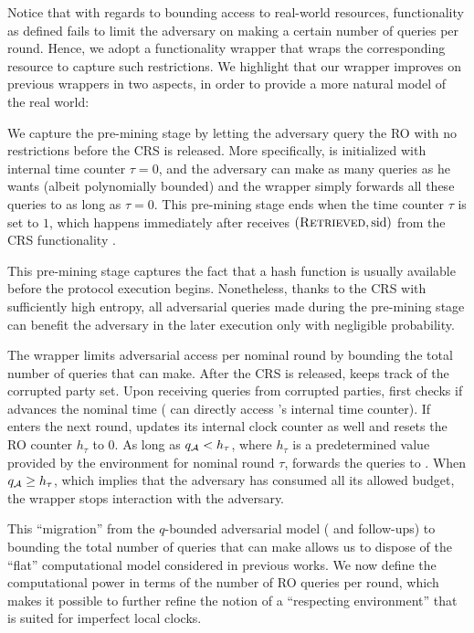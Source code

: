 Notice that with regards to bounding access to real-world resources, functionality \funcRO as defined fails to limit the adversary on making a certain number of queries per round.
%
Hence, we adopt a functionality wrapper \cite{C:BMTZ17,EC:GKOPZ20} \wrapper{\funcRO} that wraps the corresponding resource to capture such restrictions.
We highlight that our wrapper \wrapper{\funcRO} improves on previous wrappers in two aspects, in order to provide a more natural model of the real world:
%
\begin{cccItemize}[noitemsep]
      \item We capture the pre-mining stage by letting the adversary query the RO with no restrictions before the CRS is released.
      More specifically, \wrapper{\funcRO} is initialized with internal time counter $\tau = 0$, and the adversary can make as many queries as he wants (albeit polynomially bounded) and the wrapper simply forwards all these queries to \funcRO as long as $\tau = 0$.
      This pre-mining stage ends when the time counter $\tau$ is set to $1$, which happens immediately after \wrapper{\funcRO} receives $(\textsc{Retrieved}, \mathrm{sid})$ from the CRS functionality \funcCRS.

      This pre-mining stage captures the fact that a hash function is usually available before the protocol execution begins.
      Nonetheless, thanks to the CRS with sufficiently high entropy, all adversarial queries made during the pre-mining stage can benefit the adversary in the later execution only with negligible probability.

      \item The wrapper limits adversarial access per nominal round by bounding the total number of queries that \adv can make.
      After the CRS is released, \wrapper{\funcRO} keeps track of the corrupted party set.
      Upon receiving queries from corrupted parties, \wrapper{\funcRO} first checks if \funcImpClock advances the nominal time (\wrapper{\funcRO} can directly access \funcImpClock's internal time counter).
      If \funcImpClock enters the next round, \wrapper{\funcRO} updates its internal clock counter as well and resets the RO counter $h_\tau$
      to 0.
      As long as $q_\mathcal{A} < h_\tau$, where $h_\tau$ is a predetermined value provided by the environment \environment for nominal round $\tau$, \wrapper{\funcRO} forwards the queries to \funcRO.
      When $q_\mathcal{A} \ge h_\tau$, which implies that the adversary has
      consumed all its allowed budget, the wrapper stops interaction with
      the adversary.

      This ``migration'' from the $q$-bounded adversarial model (\cite{EC:GarKiaLeo15} and follow-ups) to bounding the total number of queries that \adv can make allows us to dispose of the ``flat'' computational model considered in previous works.
      We now define the computational power in terms of the number of RO queries per round, which makes it possible to further refine the notion of a ``respecting environment'' that is suited for imperfect local clocks.
\end{cccItemize}

